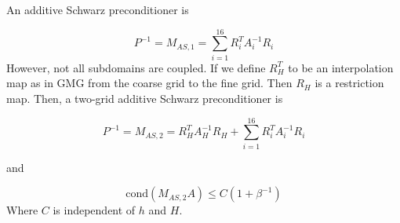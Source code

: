 An additive Schwarz preconditioner is

\begin{equation*}
    P^{-1} = M_{AS, 1} = \sum_{i=1}^{16} R_i^TA_i^{-1}R_i
\end{equation*}
However, not all subdomains are coupled. If we define $R_H^T$ to be an interpolation map as in GMG from the coarse grid to the fine grid. Then $R_H$ is a restriction map. Then, a two-grid additive Schwarz preconditioner is

\begin{equation*}
    P^{-1} = M_{AS, 2} = R_H^TA_H^{-1}R_H+\sum_{i=1}^{16} R_i^TA_i^{-1}R_i
\end{equation*}

and

\begin{equation*}
    \text{cond}(M_{AS, 2}A) \leq C (1+\beta^{-1})
\end{equation*}
Where $C$ is independent of $h$ and $H$.
